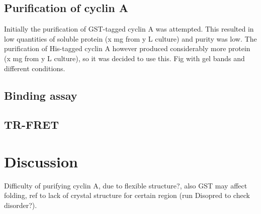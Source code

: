 \subsection{Purification of cyclin A}

Initially the purification of GST-tagged cyclin A was attempted.
This resulted in low quantities of soluble protein (x mg from y L culture) and purity was low.
The purification of His-tagged cyclin A however produced considerably more protein (x mg from y L culture), so it was decided to use this.
Fig with gel bands and different conditions.


\subsection{Binding assay}


\subsection{TR-FRET}


\section{Discussion}

Difficulty of purifying cyclin A, due to flexible structure?, also GST may affect folding, ref to lack of crystal structure for certain region (run Disopred to check disorder?).
